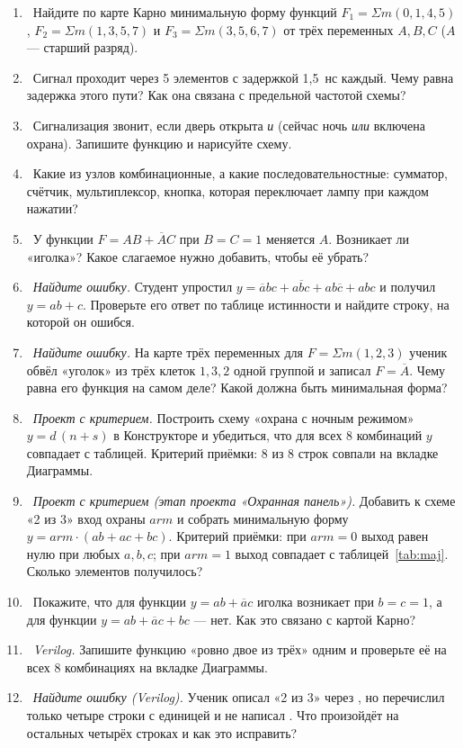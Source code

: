 \begin{taskbox}
\begin{enumerate}
  \item {}~Найдите по карте Карно минимальную форму функций $F_1=\Sigma m(0,1,4,5)$, $F_2=\Sigma m(1,3,5,7)$ и $F_3=\Sigma m(3,5,6,7)$ от трёх переменных $A,B,C$ ($A$ --- старший разряд).
  \item {}~Сигнал проходит через 5 элементов с задержкой 1,5~нс каждый. Чему равна задержка этого пути? Как она связана с предельной частотой схемы?
  \item {}~Сигнализация звонит, если дверь открыта \emph{и} (сейчас ночь \emph{или} включена охрана). Запишите функцию и нарисуйте схему.
  \item {}~Какие из узлов комбинационные, а какие последовательностные: сумматор, счётчик, мультиплексор, кнопка, которая переключает лампу при каждом нажатии?
  \item {}~У функции $F = AB + \overline{A}C$ при $B=C=1$ меняется $A$. Возникает ли «иголка»? Какое слагаемое нужно добавить, чтобы её убрать?
  \item {}~\emph{Найдите ошибку.} Студент упростил $y=\overline{a}bc+a\overline{b}c+ab\overline{c}+abc$ и получил $y=ab+c$. Проверьте его ответ по таблице истинности и найдите строку, на которой он ошибся.
  \item {}~\emph{Найдите ошибку.} На карте трёх переменных для $F=\Sigma m(1,2,3)$ ученик обвёл «уголок» из трёх клеток $1,3,2$ одной группой и записал $F=\overline{A}$. Чему равна его функция на самом деле? Какой должна быть минимальная форма?
  \item {}~\emph{Проект с критерием.} Построить схему «охрана с ночным режимом» $y=d\,(n+s)$ в Конструкторе и убедиться, что для всех 8 комбинаций $y$ совпадает с таблицей. Критерий приёмки: 8 из 8 строк совпали на вкладке Диаграммы.
  \item {}~\emph{Проект с критерием (этап проекта «Охранная панель»).} Добавить к схеме «2 из 3» вход охраны $arm$ и собрать минимальную форму $y=arm\cdot(ab+ac+bc)$. Критерий приёмки: при $arm=0$ выход равен нулю при любых $a,b,c$; при $arm=1$ выход совпадает с таблицей~\ref{tab:maj}. Сколько элементов получилось?
  \item {}~Покажите, что для функции $y=ab+\overline{a}c$ иголка возникает при $b=c=1$, а для функции $y=ab+\overline{a}c+bc$ --- нет. Как это связано с картой Карно?
  \item {}~\emph{Verilog.} Запишите функцию «ровно двое из трёх» одним  и проверьте её на всех 8 комбинациях на вкладке Диаграммы.
  \item {}~\emph{Найдите ошибку (Verilog).} Ученик описал «2 из 3» через , но перечислил только четыре строки с единицей и не написал . Что произойдёт на остальных четырёх строках и как это исправить?
\end{enumerate}
\end{taskbox}

